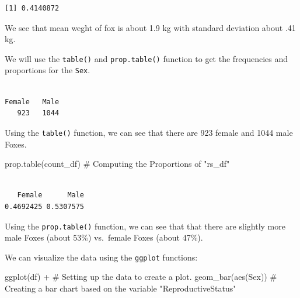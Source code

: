 \documentclass[
  letterpaper,
]{report}
\newenvironment{Shaded}{\begin{snugshade}}{\end{snugshade}}
\newcommand{\CommentTok}[1]{\textcolor[rgb]{0.37,0.37,0.37}{#1}}
\newcommand{\FunctionTok}[1]{\textcolor[rgb]{0.28,0.35,0.67}{#1}}
\newcommand{\NormalTok}[1]{\textcolor[rgb]{0.00,0.23,0.31}{#1}}
\newcommand{\OtherTok}[1]{\textcolor[rgb]{0.00,0.23,0.31}{#1}}
\newcommand{\SpecialCharTok}[1]{\textcolor[rgb]{0.37,0.37,0.37}{#1}}
\begin{document}
\begin{verbatim}
[1] 0.4140872
\end{verbatim}

We see that mean weght of fox is about 1.9 kg with standard deviation
about .41 kg.

We will use the \texttt{table()} and \texttt{prop.table()} function to
get the frequencies and proportions for the \texttt{Sex}.

\begin{Shaded}
\end{Shaded}

\begin{verbatim}

Female   Male 
   923   1044 
\end{verbatim}

Using the \texttt{table()} function, we can see that there are 923
female and 1044 male Foxes.

\begin{Shaded}
\begin{Highlighting}[]
\FunctionTok{prop.table}\NormalTok{(count\_df) }\CommentTok{\# Computing the Proportions of "rs\_df"}
\end{Highlighting}
\end{Shaded}

\begin{verbatim}

   Female      Male 
0.4692425 0.5307575 
\end{verbatim}

Using the \texttt{prop.table()} function, we can see that that there are
slightly more male Foxes (about 53\%) vs.~female Foxes (about 47\%).

We can visualize the data using the \texttt{ggplot} functions:

\begin{Shaded}
\begin{Highlighting}[]
\FunctionTok{ggplot}\NormalTok{(df) }\SpecialCharTok{+} \CommentTok{\# Setting up the data to create a plot.}
  \FunctionTok{geom\_bar}\NormalTok{(}\FunctionTok{aes}\NormalTok{(Sex)) }\CommentTok{\# Creating a bar chart based on the variable "ReproductiveStatus"}
\end{Highlighting}
\end{Shaded}
\end{document}
